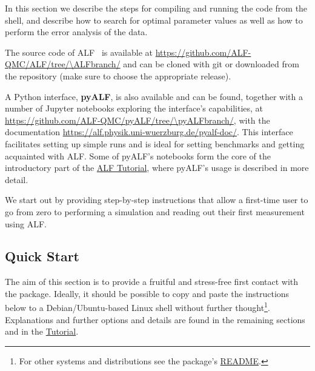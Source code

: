 


In this section we describe the steps for compiling and running the code from the shell, and describe how to search for optimal parameter values as well as how to perform the error analysis of the data.

The source code of ALF~\ALFver{} is available at \url{https://github.com/ALF-QMC/ALF/tree/\ALFbranch/} and can be cloned with git or downloaded from the repository (make sure to choose the appropriate release).

A Python interface, \textbf{pyALF}, is also available and can be found, together with a number of Jupyter notebooks exploring the interface's capabilities, at \url{https://github.com/ALF-QMC/pyALF/tree/\pyALFbranch/}, with the documentation \url{https://alf.physik.uni-wuerzburg.de/pyalf-doc/}. This interface facilitates setting up simple runs and is ideal for setting benchmarks and getting acquainted with ALF. Some of pyALF's notebooks form the core of the introductory part of the \href{https://github.com/ALF-QMC/ALF_Tutorial_and_Presentations/blob/master/Tutorial-ALF-\tutALFver/}{ALF Tutorial}, where pyALF's usage is described in more detail.

We start out by providing step-by-step instructions that allow a first-time user to go from zero to performing a simulation and reading out their first measurement using ALF.

\subsection{Quick Start}
\label{sec:quick_alf}

The aim of this section is to provide a fruitful and stress-free first contact with the package. Ideally, it should be possible to copy and paste the instructions below to a Debian/Ubuntu-based Linux shell without further thought\footnote{For other systems and distributions see the package's  \href{https://github.com/ALF-QMC/ALF/blob/\ALFbranch/README.md}{README}.}. Explanations and further options and details are found in the remaining sections and in the \href{https://github.com/ALF-QMC/ALF_Tutorial_and_Presentations/blob/master/Tutorial-ALF-\tutALFver/}{Tutorial}.

